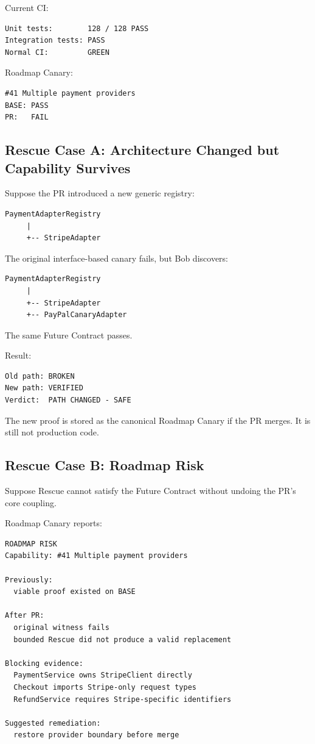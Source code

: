 \documentclass[12pt]{article}
\begin{document}
Current CI:

\begin{lstlisting}
Unit tests:        128 / 128 PASS
Integration tests: PASS
Normal CI:         GREEN
\end{lstlisting}

Roadmap Canary:

\begin{lstlisting}
#41 Multiple payment providers
BASE: PASS
PR:   FAIL
\end{lstlisting}

\subsection{Rescue Case A: Architecture Changed but Capability Survives}

Suppose the PR introduced a new generic registry:

\begin{lstlisting}
PaymentAdapterRegistry
     |
     +-- StripeAdapter
\end{lstlisting}

The original interface-based canary fails, but Bob discovers:

\begin{lstlisting}
PaymentAdapterRegistry
     |
     +-- StripeAdapter
     +-- PayPalCanaryAdapter
\end{lstlisting}

The same Future Contract passes.

Result:

\begin{lstlisting}
Old path: BROKEN
New path: VERIFIED
Verdict:  PATH CHANGED - SAFE
\end{lstlisting}

The new proof is stored as the canonical Roadmap Canary if the PR merges. It is still not production code.

\subsection{Rescue Case B: Roadmap Risk}

Suppose Rescue cannot satisfy the Future Contract without undoing the PR's core coupling.

Roadmap Canary reports:

\begin{lstlisting}
ROADMAP RISK
Capability: #41 Multiple payment providers

Previously:
  viable proof existed on BASE

After PR:
  original witness fails
  bounded Rescue did not produce a valid replacement

Blocking evidence:
  PaymentService owns StripeClient directly
  Checkout imports Stripe-only request types
  RefundService requires Stripe-specific identifiers

Suggested remediation:
  restore provider boundary before merge
\end{lstlisting}
\end{document}
